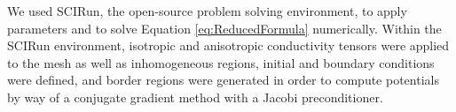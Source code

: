 We used SCIRun, the open-source problem solving environment, to apply parameters and to solve Equation  \ref{eq:ReducedFormula} numerically.  Within the SCIRun environment, isotropic and anisotropic conductivity tensors were applied to the mesh as well as inhomogeneous regions, initial and boundary conditions were defined, and border regions were generated in order to compute potentials by way of a conjugate gradient method with a Jacobi preconditioner.




